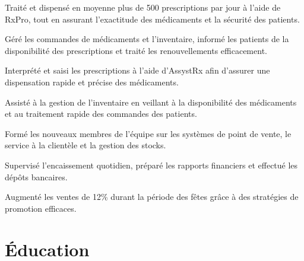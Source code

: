 \documentclass[letterpaper,10pt]{article}
\begin{document}
\begin{resume_list}
\item Traité et dispensé en moyenne plus de 500 prescriptions par jour à l’aide de RxPro, tout en assurant l’exactitude des médicaments et la sécurité des patients.
\item Géré les commandes de médicaments et l’inventaire, informé les patients de la disponibilité des prescriptions et traité les renouvellements efficacement.
\end{resume_list}

\begin{resume_list}
\item Interprété et saisi les prescriptions à l’aide d’AssystRx afin d’assurer une dispensation rapide et précise des médicaments.
\item Assisté à la gestion de l’inventaire en veillant à la disponibilité des médicaments et au traitement rapide des commandes des patients.
\end{resume_list}

\begin{resume_list}
\item Formé les nouveaux membres de l’équipe sur les systèmes de point de vente, le service à la clientèle et la gestion des stocks.
\item Supervisé l’encaissement quotidien, préparé les rapports financiers et effectué les dépôts bancaires.
\item Augmenté les ventes de 12\% durant la période des fêtes grâce à des stratégies de promotion efficaces.
\end{resume_list}

\section{Éducation}

\vspace{10pt}
\end{document}
